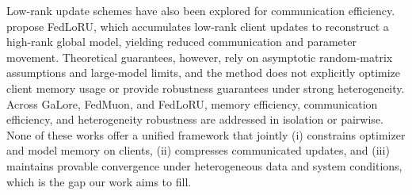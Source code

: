 \documentclass[11pt]{article}
\begin{document}
Low-rank update schemes have also been explored for communication efficiency. \citet{park2024communication} propose FedLoRU, which accumulates low-rank client updates to reconstruct a high-rank global model, yielding reduced communication and parameter movement. Theoretical guarantees, however, rely on asymptotic random-matrix assumptions and large-model limits, and the method does not explicitly optimize client memory usage or provide robustness guarantees under strong heterogeneity. Across GaLore, FedMuon, and FedLoRU, memory efficiency, communication efficiency, and heterogeneity robustness are addressed in isolation or pairwise. None of these works offer a unified framework that jointly (i) constrains optimizer and model memory on clients, (ii) compresses communicated updates, and (iii) maintains provable convergence under heterogeneous data and system conditions, which is the gap our work aims to fill.



\end{document}
